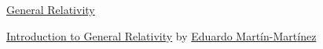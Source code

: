 \documentclass[11pt]{article}
\begin{document}
	\kaishu 
	\setcounter{section}{0}
	\begin{center}
		{\LARGE  \href{https://en.wikipedia.org/wiki/General_relativity}{General Relativity}}
	\end{center}
\setcounter{page}{1}

\vspace{-0.75cm}

\begin{center}
	{\large  \href{https://www.youtube.com/playlist?list=PLeoh1MW56PeLn-tYxepNXBnfTMdbBemfJ}{Introduction to General Relativity} by {\large \href{https://sites.google.com/site/emmfis/homepage}{Eduardo Mart{\'i}n-Mart{\'i}nez}}}
\end{center}

\vspace{-1cm}
\end{document}
